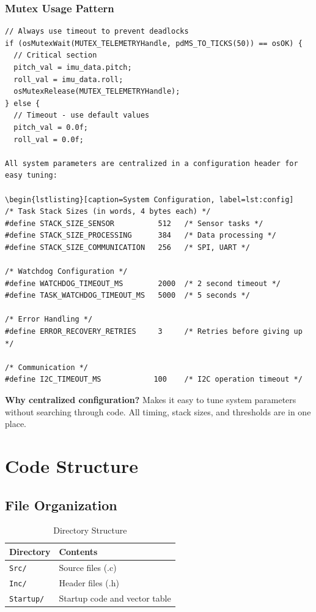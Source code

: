 \documentclass[11pt,a4paper]{article}
\begin{document}
\subsubsection{Mutex Usage Pattern}
\begin{lstlisting}[caption=Safe Mutex Usage, label=lst:mutex]
// Always use timeout to prevent deadlocks
if (osMutexWait(MUTEX_TELEMETRYHandle, pdMS_TO_TICKS(50)) == osOK) {
  // Critical section
  pitch_val = imu_data.pitch;
  roll_val = imu_data.roll;
  osMutexRelease(MUTEX_TELEMETRYHandle);
} else {
  // Timeout - use default values
  pitch_val = 0.0f;
  roll_val = 0.0f;

All system parameters are centralized in a configuration header for easy tuning:

\begin{lstlisting}[caption=System Configuration, label=lst:config]
/* Task Stack Sizes (in words, 4 bytes each) */
#define STACK_SIZE_SENSOR          512   /* Sensor tasks */
#define STACK_SIZE_PROCESSING      384   /* Data processing */
#define STACK_SIZE_COMMUNICATION   256   /* SPI, UART */

/* Watchdog Configuration */
#define WATCHDOG_TIMEOUT_MS        2000  /* 2 second timeout */
#define TASK_WATCHDOG_TIMEOUT_MS   5000  /* 5 seconds */

/* Error Handling */
#define ERROR_RECOVERY_RETRIES     3     /* Retries before giving up */

/* Communication */
#define I2C_TIMEOUT_MS            100    /* I2C operation timeout */
\end{lstlisting}

\textbf{Why centralized configuration?} Makes it easy to tune system parameters without searching through code. All timing, stack sizes, and thresholds are in one place.

\section{Code Structure}

\subsection{File Organization}
\begin{table}[H]
\centering
\begin{tabular}{@{}ll@{}}
\toprule
\textbf{Directory} & \textbf{Contents} \\
\midrule
\texttt{Src/} & Source files (.c) \\
\texttt{Inc/} & Header files (.h) \\
\texttt{Startup/} & Startup code and vector table \\
\bottomrule
\end{tabular}
\caption{Directory Structure}
\end{table}
\end{document}
